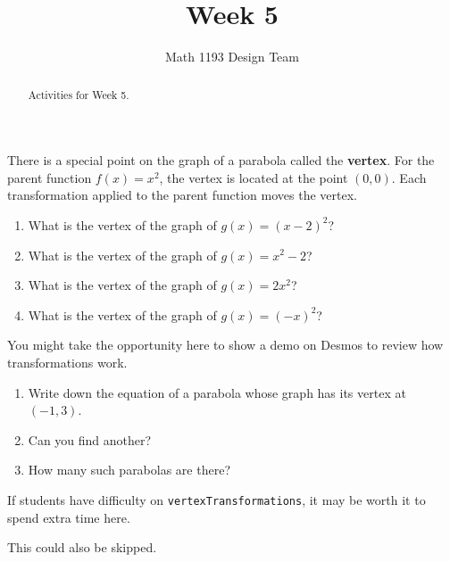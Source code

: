 \documentclass[noauthor]{ximera}
\title{Week 5}
\author{Math 1193 Design Team}
\begin{document}
\begin{abstract}
    Activities for Week 5.
\end{abstract}
\maketitle

\begin{problem}
There is a special point on the graph of a parabola called the 
\textbf{vertex}. For the parent function \(f\left(x\right)=x^2\), 
the vertex is located at the point \((0,0)\). Each transformation 
applied to the parent function moves the vertex.

\begin{enumerate}
    \item What is the vertex of the graph of \(g(x) = (x - 2)^2\)?
    \item What is the vertex of the graph of \(g(x) = x^2 - 2\)?
    \item What is the vertex of the graph of \(g(x) = 2x^2\)?
    \item What is the vertex of the graph of \(g(x) = (-x)^2\)?
\end{enumerate}

\begin{instructorNotes}
You might take the opportunity here to show a demo on Desmos to review
how transformations work.
\end{instructorNotes}
\end{problem}

\begin{problem}
\begin{enumerate}
    \item Write down the equation of a parabola whose graph has
    its vertex at \((-1, 3)\).
    \item Can you find another?
    \item How many such parabolas are there?
\end{enumerate}

\begin{instructorNotes}
If students have difficulty on \verb+vertexTransformations+, it may 
be worth it to spend extra time here. 

This could also be skipped.
\end{instructorNotes}
\end{problem}
\end{document}
